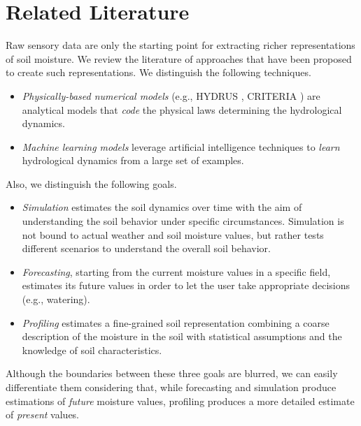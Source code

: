 \section{Related Literature}
\label{pluto-sec:related}

Raw sensory data are only the starting point for extracting richer representations of soil moisture. 
We review the literature of approaches that
have been proposed to create such representations. We distinguish the following techniques.
\begin{itemize}
    \item \emph{Physically-based numerical models} (e.g., HYDRUS \cite{hydrus2008587}, CRITERIA \cite{Bittelli2011253}) are analytical models that \textit{code} the physical laws determining the hydrological dynamics.
    \item \emph{Machine learning models} leverage artificial intelligence techniques to \textit{learn} hydrological dynamics from a large set of examples. 
\end{itemize}
Also, we distinguish the following goals.
\begin{itemize}
    \item \emph{Simulation} estimates the soil dynamics over time with the aim of understanding the soil behavior under specific circumstances. Simulation is not bound to actual weather and soil moisture values, but rather tests different scenarios to understand the overall soil behavior.
    \item \emph{Forecasting}, starting from the current moisture values in a specific field, estimates its future values in order to let the user take appropriate decisions (e.g., watering).
    \item \emph{Profiling} estimates a fine-grained soil representation combining a coarse description of the moisture in the soil with statistical assumptions and the knowledge of soil characteristics. 
\end{itemize}
Although the boundaries between these three goals are blurred, we can easily differentiate them considering that, while forecasting and simulation produce estimations of \emph{future} moisture values, profiling produces a more detailed estimate of \emph{present} values.

